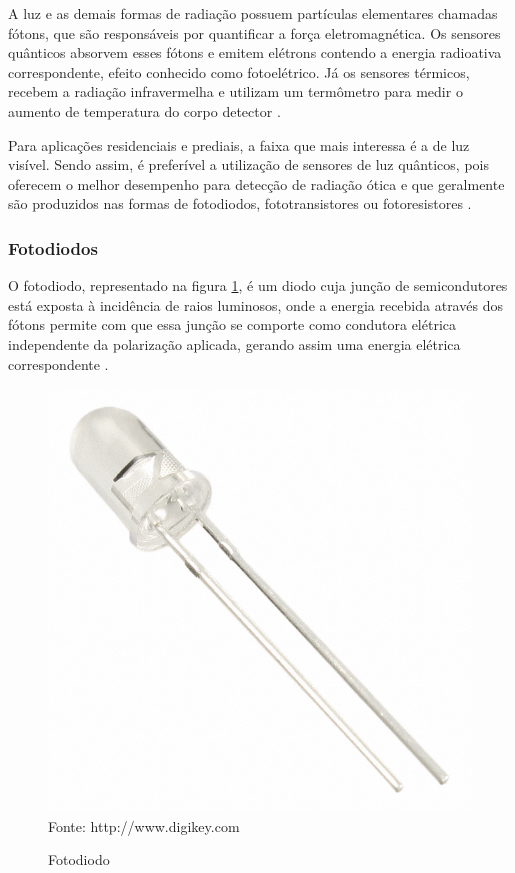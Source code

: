 A luz e as demais formas de radiação possuem partículas elementares chamadas fótons, que são responsáveis por
quantificar a força eletromagnética. Os sensores quânticos absorvem esses fótons e emitem elétrons contendo a
energia radioativa correspondente, efeito conhecido como fotoelétrico. Já os sensores térmicos, recebem a
radiação infravermelha e utilizam um termômetro para medir o aumento de temperatura do corpo detector
\cite{kenny2005}.

Para aplicações residenciais e prediais, a faixa que mais interessa é a de luz visível. Sendo assim, é
preferível a utilização de sensores de luz quânticos, pois oferecem o melhor desempenho para detecção de
radiação ótica e que geralmente são produzidos nas formas de fotodiodos, fototransistores ou fotoresistores
\cite{fraden2010}.

\subsubsection{Fotodiodos}
O fotodiodo, representado na figura \ref{figura:photodiode}, é um diodo cuja junção de semicondutores está exposta à incidência de raios luminosos, onde a
energia recebida através dos fótons permite com que essa junção se comporte como condutora elétrica
independente da polarização aplicada, gerando assim uma energia elétrica correspondente \cite{sinclair2001}.

\begin{figure}[h]
	\caption{Fotodiodo}
	\centering
	\includegraphics[scale=0.2]{../images/photodiode.jpg}
	\hspace{\linewidth}
	Fonte: http://www.digikey.com
	\label{figura:photodiode}
\end{figure}

